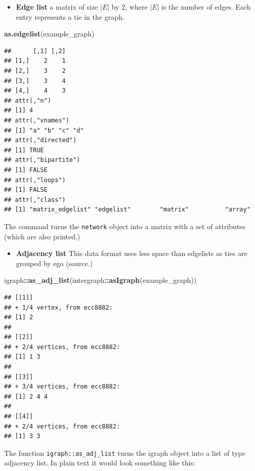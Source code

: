 \documentclass[]{book}
\newenvironment{Shaded}{\begin{snugshade}}{\end{snugshade}}
\newcommand{\KeywordTok}[1]{\textcolor[rgb]{0.13,0.29,0.53}{\textbf{#1}}}
\newcommand{\NormalTok}[1]{#1}
\newcommand{\OperatorTok}[1]{\textcolor[rgb]{0.81,0.36,0.00}{\textbf{#1}}}
\providecommand{\tightlist}{%
  \setlength{\itemsep}{0pt}\setlength{\parskip}{0pt}}
\begin{document}
\begin{itemize}
\tightlist
\item
  \textbf{Edge list} a matrix of size \(|E|\) by \(2\), where \(|E|\) is the number of edges.
  Each entry represents a tie in the graph.
\end{itemize}

\begin{Shaded}
\begin{Highlighting}[]
\KeywordTok{as.edgelist}\NormalTok{(example_graph)}
\end{Highlighting}
\end{Shaded}

\begin{verbatim}
##      [,1] [,2]
## [1,]    2    1
## [2,]    3    2
## [3,]    3    4
## [4,]    4    3
## attr(,"n")
## [1] 4
## attr(,"vnames")
## [1] "a" "b" "c" "d"
## attr(,"directed")
## [1] TRUE
## attr(,"bipartite")
## [1] FALSE
## attr(,"loops")
## [1] FALSE
## attr(,"class")
## [1] "matrix_edgelist" "edgelist"        "matrix"          "array"
\end{verbatim}

The command turns the \texttt{network} object into a matrix with a set of attributes
(which are also printed.)

\begin{itemize}
\tightlist
\item
  \textbf{Adjacency list} This data format uses less space than edgelists as ties are
  grouped by ego (source.)
\end{itemize}

\begin{Shaded}
\begin{Highlighting}[]
\NormalTok{igraph}\OperatorTok{::}\KeywordTok{as_adj_list}\NormalTok{(intergraph}\OperatorTok{::}\KeywordTok{asIgraph}\NormalTok{(example_graph)) }
\end{Highlighting}
\end{Shaded}

\begin{verbatim}
## [[1]]
## + 1/4 vertex, from ecc8882:
## [1] 2
## 
## [[2]]
## + 2/4 vertices, from ecc8882:
## [1] 1 3
## 
## [[3]]
## + 3/4 vertices, from ecc8882:
## [1] 2 4 4
## 
## [[4]]
## + 2/4 vertices, from ecc8882:
## [1] 3 3
\end{verbatim}

The function \texttt{igraph::as\_adj\_list} turns the igraph object into a list of
type adjacency list. In plain text it would look something like this:
\end{document}
